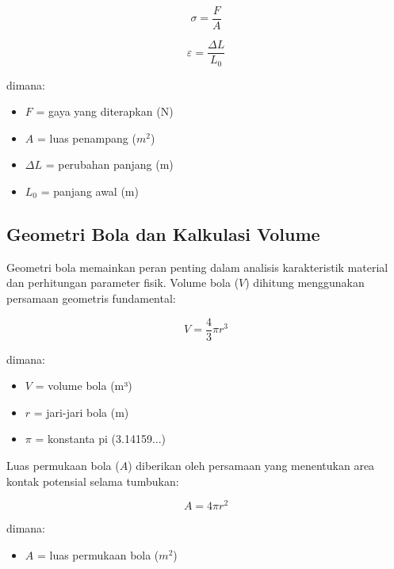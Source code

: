 \begin{equation}
    \sigma = \frac{F}{A}
\end{equation}

\begin{equation}
    \varepsilon = \frac{\Delta L}{L_0}
\end{equation}

dimana:
\begin{itemize}
    \item $F$ = gaya yang diterapkan (N)
    \item $A$ = luas penampang ($m^2$)
    \item $\Delta L$ = perubahan panjang (m)
    \item $L_0$ = panjang awal (m)
\end{itemize}

\subsection{Geometri Bola dan Kalkulasi Volume}
Geometri bola memainkan peran penting dalam analisis karakteristik material dan perhitungan parameter fisik. Volume bola ($V$) dihitung menggunakan persamaan geometris fundamental:

\begin{equation}
    V = \frac{4}{3}\pi r^3
\end{equation}

dimana:
\begin{itemize}
    \item $V$ = volume bola (m³)
    \item $r$ = jari-jari bola (m)
    \item $\pi$ = konstanta pi (3.14159...)
\end{itemize}

Luas permukaan bola ($A$) diberikan oleh persamaan yang menentukan area kontak potensial selama tumbukan:

\begin{equation}
    A = 4\pi r^2
\end{equation}

dimana:
\begin{itemize}
    \item $A$ = luas permukaan bola ($m^2$)
\end{itemize}

